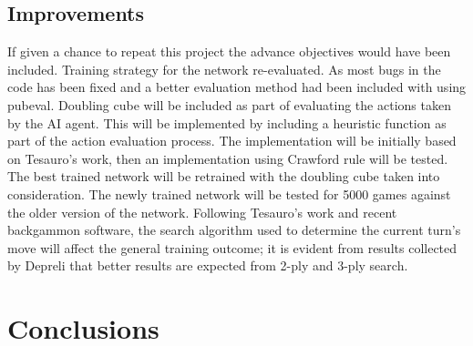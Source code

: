 \documentclass[12pt,a4paper]{article}
\begin{document}
\subsection{Improvements}
If given a chance to repeat this project the advance objectives would have been included. Training strategy for the network re-evaluated. As most bugs in the code has been fixed and a better evaluation method had been included with using pubeval. Doubling cube will be included as part of evaluating the actions taken by the AI agent. This will be implemented by including a heuristic function as part of the action evaluation process. The implementation will be initially based on Tesauro's \citeyear{DBLP:journals/ai/Tesauro02} work, then an implementation using Crawford rule will be tested. The best trained network will be retrained with the doubling cube taken into consideration. The newly trained network will be tested for 5000 games against the older version of the network. 
Following Tesauro's \citeyear{DBLP:journals/ai/Tesauro02} work and recent backgammon software, the search algorithm used to determine the current turn's move will affect the general training outcome; it is evident from results collected by Depreli \citeyear{botbattle} that better results are expected from 2-ply and 3-ply search. 

\section{Conclusions}


\end{document}
